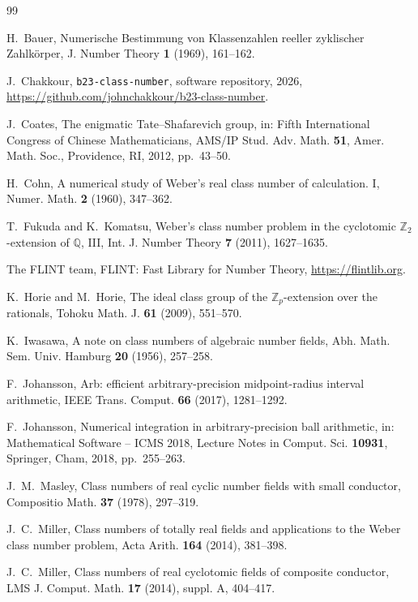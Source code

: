 \documentclass[11pt]{amsart}
\theoremstyle{plain}
\theoremstyle{definition}
\begin{document}
\begin{thebibliography}{99}

 H.~Bauer, Numerische Bestimmung von Klassenzahlen reeller zyklischer Zahlk\"orper, J. Number Theory \textbf{1} (1969), 161--162.

 J.~Chakkour, \texttt{b23-class-number}, software repository, 2026, \url{https://github.com/johnchakkour/b23-class-number}.

 J.~Coates, The enigmatic Tate--Shafarevich group, in: Fifth International Congress of Chinese Mathematicians, AMS/IP Stud. Adv. Math. \textbf{51}, Amer. Math. Soc., Providence, RI, 2012, pp.~43--50.

 H.~Cohn, A numerical study of Weber's real class number of calculation. I, Numer. Math. \textbf{2} (1960), 347--362.

 T.~Fukuda and K.~Komatsu, Weber's class number problem in the cyclotomic $\mathbb{Z}_2$-extension of $\mathbb{Q}$, III, Int. J. Number Theory \textbf{7} (2011), 1627--1635.

 The FLINT team, FLINT: Fast Library for Number Theory, \url{https://flintlib.org}.

 K.~Horie and M.~Horie, The ideal class group of the $\mathbb{Z}_p$-extension over the rationals, Tohoku Math. J. \textbf{61} (2009), 551--570.

 K.~Iwasawa, A note on class numbers of algebraic number fields, Abh. Math. Sem. Univ. Hamburg \textbf{20} (1956), 257--258.

 F.~Johansson, Arb: efficient arbitrary-precision midpoint-radius interval arithmetic, IEEE Trans. Comput. \textbf{66} (2017), 1281--1292.

 F.~Johansson, Numerical integration in arbitrary-precision ball arithmetic, in: Mathematical Software -- ICMS 2018, Lecture Notes in Comput. Sci. \textbf{10931}, Springer, Cham, 2018, pp.~255--263.

 J.~M.~Masley, Class numbers of real cyclic number fields with small conductor, Compositio Math. \textbf{37} (1978), 297--319.

 J.~C.~Miller, Class numbers of totally real fields and applications to the Weber class number problem, Acta Arith. \textbf{164} (2014), 381--398.

 J.~C.~Miller, Class numbers of real cyclotomic fields of composite conductor, LMS J. Comput. Math. \textbf{17} (2014), suppl. A, 404--417.


\end{thebibliography}
\end{document}
